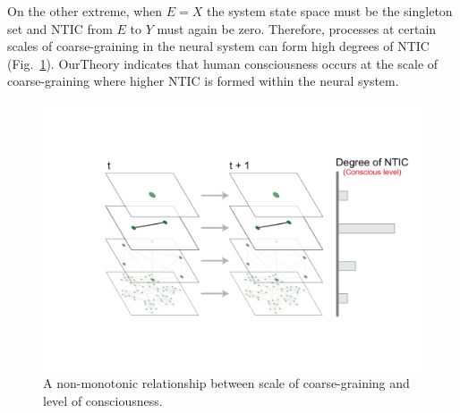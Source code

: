\documentclass[utf8]{article}
\begin{document}
    		
    		
    		On the other extreme, when $E=X$ the system state space must be the singleton set and NTIC from $E$ to $Y$ must again be zero. Therefore, processes at certain scales of coarse-graining in the neural system can form high degrees of NTIC (Fig.~\ref{fig:LevelOfConsciousness}). \ac{OurTheory} indicates that human consciousness occurs at the scale of coarse-graining where higher NTIC is formed within the neural system. 
    		
    		\begin{figure}[H]				
        		\includegraphics[width=\textwidth]{Submission/Frontiers/nonMono.pdf}
        		\caption{A non-monotonic relationship between scale of coarse-graining and level of consciousness.}
        		\label{fig:LevelOfConsciousness}
    		\end{figure}
            
\end{document}
